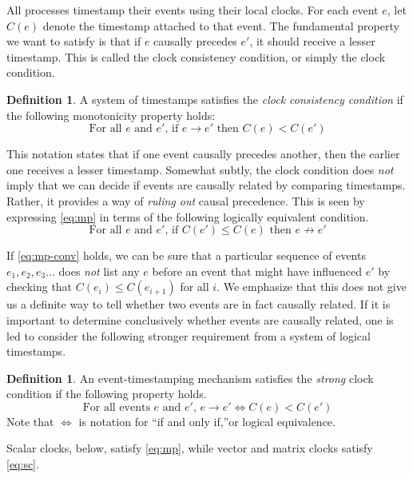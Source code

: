 \documentclass[]             %
{NASA}                       %
\theoremstyle{definition}
\newtheorem{definition}[theorem]{Definition}
\begin{document}
All processes timestamp their events using their local clocks. For
each event $e$, let $C(e)$ denote the timestamp attached to that
event. The fundamental property we want to satisfy is that if $e$
causally precedes $e'$, it should receive a lesser timestamp. This is
called the clock consistency condition, or simply the clock condition.

\begin{definition}
  A system of timestamps satisfies the \emph{clock consistency
  condition} if the following monotonicity property holds:
\begin{equation}
  \textrm{For all $e$ and $e'$, if $e \to e'$ then $C(e) < C(e')$} \label{eq:mp}\tag{CC}
\end{equation}
\end{definition}

This notation states that if one event causally precedes another, then
the earlier one receives a lesser timestamp. Somewhat subtly, the
clock condition does \emph{not} imply that we can decide if events are
causally related by comparing timestamps. Rather, it provides a way of
\emph{ruling out} causal precedence. This is seen by expressing
\eqref{eq:mp} in terms of the following logically equivalent
condition.
\begin{equation}
  \textrm{For all $e$ and $e'$, if $C(e') \leq C(e)$ then $e \not\to e'$} \label{eq:mp-conv}\tag{CC$'$}
\end{equation}

If \eqref{eq:mp-conv} holds, we can be sure that a particular sequence
of events $e_1, e_2, e_3\ldots$ does \emph{not} list any $e$ before an
event that might have influenced $e'$ by checking that
$C(e_{i}) \leq C(e_{i+1})$ for all $i$. We emphasize that this does
not give us a definite way to tell whether two events are in fact
causally related. If it is important to determine conclusively whether
events are causally related, one is led to consider the following
stronger requirement from a system of logical timestamps.
\begin{definition}
  An event-timestamping mechanism satisfies the \emph{strong} clock   condition if the following property holds.
  \begin{equation}
    \textrm{For all events $e$ and $e'$, } e \to e' \iff C(e) <
    C(e') \label{eq:sc}\tag{SC}
  \end{equation}
  Note that $\iff$ is notation for ``if and only if,''or logical
  equivalence.
\end{definition}
Scalar clocks, below, satisfy \eqref{eq:mp}, while vector and matrix
clocks satisfy \eqref{eq:sc}.
\end{document}
